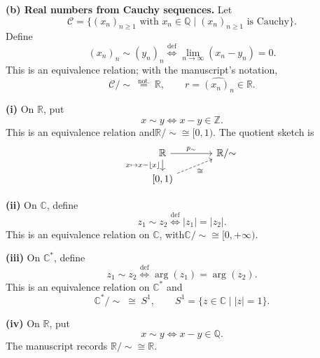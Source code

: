 \noindent\textbf{(b) Real numbers from Cauchy sequences.}
Let
\[
 \mathcal C=\bigl\{(x_n)_{n\geq1}\text{ with }x_n\in\mathbb Q
       \mid (x_n)_{n\geq1}\text{ is Cauchy}\bigr\}.
\]
Define
\[
 (x_n)_n\sim(y_n)_n
 \overset{\mathrm{def}}{\iff}
 \lim_{n\to\infty}(x_n-y_n)=0.
\]
This is an equivalence relation; with the manuscript's notation,
\[
 \mathcal C/{\sim}\ \overset{\mathrm{not.}}{=}\ \mathbb R,
 \qquad
 r=\widehat{(x_n)_n}\in\mathbb R.
\]

\medskip
\noindent\textbf{(i)} On $\mathbb R$, put
\[
 x\sim y\iff x-y\in\mathbb Z.
\]
This is an equivalence relation and\enspace\(\mathbb R/{\sim}\cong[0,1)\).
The quotient sketch is
\[
\begin{tikzcd}[column sep=large,row sep=small]
 \mathbb R\arrow[r,"p_{\sim}"]\arrow[d,"{x\mapsto x-\lfloor x\rfloor}"']
    & \mathbb R/{\sim} \\
 {[0,1)}\arrow[ur,dashed,"\cong"'] &
\end{tikzcd}
\]

\noindent\textbf{(ii)} On $\mathbb C$, define
\[
 z_1\sim z_2\overset{\mathrm{def}}{\iff}|z_1|=|z_2|.
\]
This is an equivalence relation on $\mathbb C$, with\enspace\(\mathbb C/{\sim}\cong[0,+\infty)\).

\noindent\textbf{(iii)} On $\mathbb C^*$, define
\[
 z_1\sim z_2\overset{\mathrm{def}}{\iff}
 \arg(z_1)=\arg(z_2).
\]
This is an equivalence relation on $\mathbb C^*$ and
\[
 \mathbb C^*/{\sim}\;\cong\;S^1,
 \qquad S^1=\{z\in\mathbb C\mid |z|=1\}.
\]

\noindent\textbf{(iv)} On $\mathbb R$, put
\[
 x\sim y\iff x-y\in\mathbb Q.
\]
The manuscript records $\mathbb R/{\sim}\cong\mathbb R$.

\endgroup
